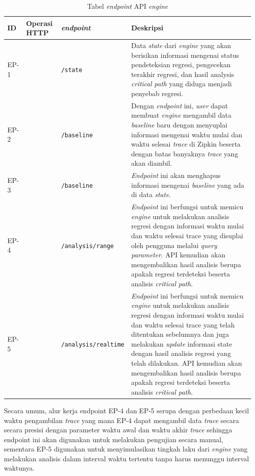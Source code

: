 \begin{small}
	\begin{longtable}{ | p{1cm} | p{2cm} | p{3.5cm} | p{7.5cm} | }
		\caption{Tabel \textit{endpoint} API \textit{engine}}
		\label{endpoints}                                                           
		\\ \hline
		\centering\bfseries{ID} & \centering\bfseries{Operasi HTTP} & \centering\bfseries{\textit{endpoint}} & \centering\bfseries{Deskripsi} \tabularnewline \hline
		\endfirsthead
		EP-1 & \centering{GET} & \centering\texttt{/state} & Data \textit{state} dari \textit{engine} yang akan berisikan informasi mengenai status pendeteksian regresi, pengecekan terakhir regresi, dan hasil analysis \textit{critical path} yang diduga menjadi penyebab regresi. \\ \hline
		EP-2 & \centering{POST} & \centering\texttt{/baseline} & Dengan \textit{endpoint} ini, \textit{user} dapat membuat \textit{engine} mengambil data \textit{baseline} baru dengan menyuplai informasi mengenai waktu mulai dan waktu selesai \textit{trace} di Zipkin beserta dengan batas banyaknya \textit{trace} yang akan diambil. \\ \hline
		EP-3 & \centering{DELETE} & \centering\texttt{/baseline} & \textit{Endpoint} ini akan menghapus informasi mengenai \textit{baseline} yang ada di data \textit{state}. \\ \hline	
		EP-4 & \centering{GET} & \centering\texttt{/analysis/range} & \textit{Endpoint} ini berfungsi untuk memicu \textit{engine} untuk melakukan analisis regresi dengan informasi waktu mulai dan waktu selesai trace yang disuplai oleh pengguna melalui \textit{query parameter}. API kemudian akan mengembalikan hasil analisis berupa apakah regresi terdeteksi beserta analisis \textit{critical path}. \\ \hline
		EP-5 & \centering{GET} & \centering\texttt{/analysis/realtime} & \textit{Endpoint} ini berfungsi untuk memicu \textit{engine} untuk melakukan analisis regresi dengan informasi waktu mulai dan waktu selesai trace yang telah ditentukan sebelumnya dan juga melakukan \textit{update} informasi state dengan hasil analisis regresi yang telah dilakukan. API kemudian akan mengembalikan hasil analisis berupa apakah regresi terdeteksi beserta analisis \textit{critical path}. \\ \hline				
	\end{longtable}
\end{small}

Secara umum, alur kerja endpoint EP-4 dan EP-5 serupa dengan perbedaan kecil waktu pengambilan \textit{trace} yang mana EP-4 dapat mengambil data \textit{trace} secara secara presisi dengan parameter waktu awal dan waktu akhir \textit{trace} sehingga endpoint ini akan digunakan untuk melakukan pengujian secara manual, sementara EP-5 digunakan untuk menyimulasikan tingkah laku dari \textit{engine} yang melakukan analisis dalam interval waktu tertentu tanpa harus menunggu interval waktunya.

